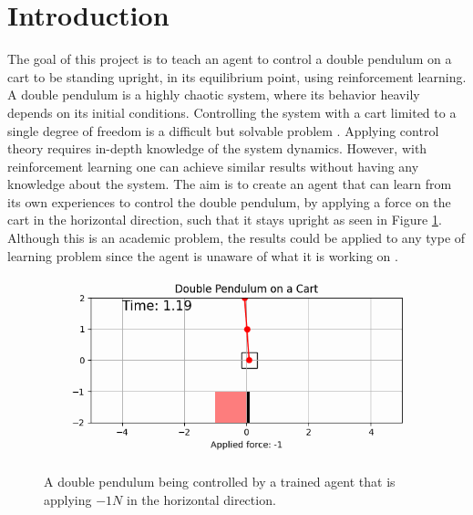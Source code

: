 \documentclass[final]{LTHtwocol} %
\begin{document}
\section{Introduction}
The goal of this project is to teach an agent to control a double pendulum on a cart to be standing upright, in its equilibrium point, using reinforcement learning.
A double pendulum is a highly chaotic system, where its behavior heavily depends on its initial conditions.
Controlling the system with a cart limited to a single degree of freedom is a difficult but solvable problem \cite{Classic_Control_Theory}.
Applying control theory requires in-depth knowledge of the system dynamics.
However, with reinforcement learning one can achieve similar results without having any knowledge about the system.
The aim is to create an agent that can learn from its own experiences to control the double pendulum, by applying a force on the cart in the horizontal direction, such that it stays upright as seen in Figure \ref{fig:double_pendulum_controlled}.
Although this is an academic problem, the results could be applied to any type of learning problem since the agent is unaware of what it is working on \cite{Deep_Q_Learning_First}.

\begin{figure}[htp]
	\centering
	\includegraphics[width=0.9\columnwidth]{figures/double_pendulum.png}
	\caption{A double pendulum being controlled by a trained agent that is applying $-1N$ in the horizontal direction.}
	\label{fig:double_pendulum_controlled}
\end{figure}

\end{document}
